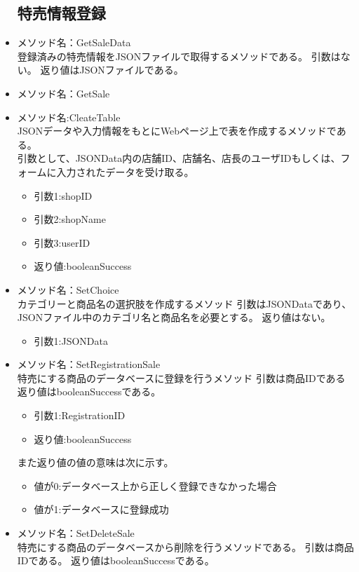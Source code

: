 \documentclass[a4j]{jarticle}
\begin{document}
\begin{itemize}
\subsection{特売情報登録}
\item メソッド名：GetSaleData\\

登録済みの特売情報をJSONファイルで取得するメソッドである。
引数はない。
返り値はJSONファイルである。

\item メソッド名：GetSale\\

\item メソッド名:CleateTable\\
JSONデータや入力情報をもとにWebページ上で表を作成するメソッドである。\\
引数として、JSONData内の店舗ID、店舗名、店長のユーザIDもしくは、フォームに入力されたデータを受け取る。
	\begin{itemize}	
		\item 引数1:shopID
		\item 引数2:shopName
		\item 引数3:userID
		\item 返り値:booleanSuccess
	\end{itemize}
\item メソッド名：SetChoice\\

カテゴリーと商品名の選択肢を作成するメソッド
引数はJSONDataであり、JSONファイル中のカテゴリ名と商品名を必要とする。
返り値はない。
	\begin{itemize}
		\item 引数1:JSONData
	\end{itemize}
	
\item メソッド名：SetRegistrationSale\\

特売にする商品のデータベースに登録を行うメソッド
引数は商品IDである%
返り値はbooleanSuccessである。

	\begin{itemize}
		\item 引数1:RegistrationID
		\item 返り値:booleanSuccess
	\end{itemize}
また返り値の値の意味は次に示す。
	\begin{itemize}
		\item 値が0:データベース上から正しく登録できなかった場合
		\item 値が1:データベースに登録成功
	\end{itemize}
\item メソッド名：SetDeleteSale\\
特売にする商品のデータベースから削除を行うメソッドである。
引数は商品IDである。
返り値はbooleanSuccessである。


\end{itemize}
\end{document}
